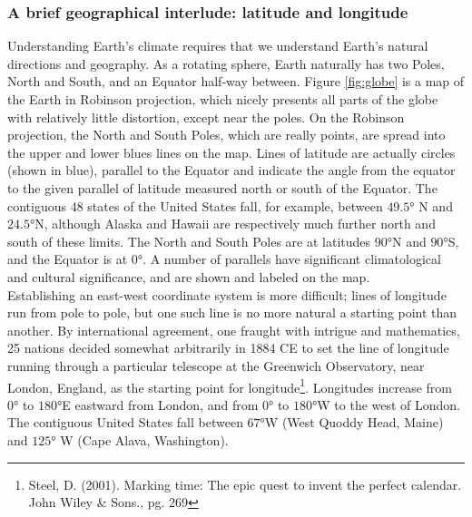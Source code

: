 \documentclass[amstex,12pt]{book}
\begin{document}
\subsubsection{A brief geographical interlude: latitude and longitude}
Understanding Earth's climate requires that we understand Earth’s natural directions and geography. As a rotating sphere, Earth naturally has two Poles, North and South, and an Equator half-way between. Figure \ref{fig:globe} is a map of the Earth in Robinson projection, which nicely presents all parts of the globe with relatively little distortion, except near the poles. On the Robinson projection, the North and South Poles, which are really points, are spread into the upper and lower blues lines on the map. Lines of latitude are actually circles (shown in blue), parallel to the Equator and indicate the angle from the equator to the given parallel of latitude measured north or south of the Equator. The contiguous 48 states of the United States fall, for example, between $\ang{49.5}$ N and $\ang{24.5}$N, although Alaska and Hawaii are respectively much further north and south of these limits. The North and South Poles are at latitudes $\ang{90}$N and $\ang{90}$S, and the Equator is at $\ang{0}$. A number of parallels have significant climatological and cultural significance, and are shown and labeled on the map. \\
Establishing an east-west coordinate system is more difficult; lines of longitude run from pole to pole, but one such line is no more natural a starting point than another. By international agreement, one fraught with intrigue and mathematics, 25 nations decided somewhat arbitrarily in 1884 CE to set the line of longitude running through a particular telescope at the Greenwich Observatory, near London, England, as the starting point for longitude\footnote{Steel, D. (2001). Marking time: The epic quest to invent the perfect calendar. John Wiley \& Sons., pg. 269}. Longitudes increase from $\ang{0}$ to $\ang{180}$E eastward from London, and from $\ang{0}$ to $\ang{180}$W to the west of London. The contiguous United States fall between $\ang{67}$W (West Quoddy Head, Maine) and $\ang{125}$ W (Cape Alava, Washington).\\
\end{document}
